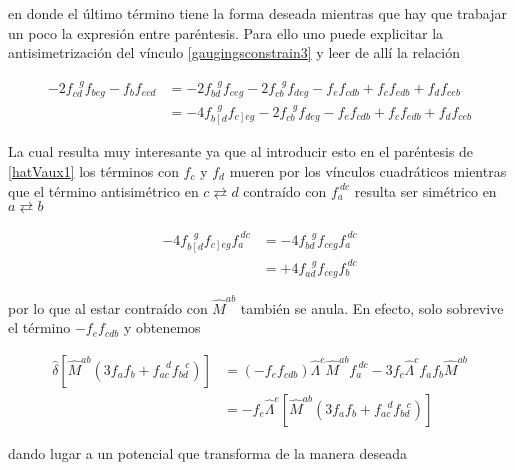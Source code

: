 \documentclass{article}
\numberwithin{equation}{section}
\begin{document}
en donde el último término tiene la forma deseada mientras que hay que trabajar un poco la expresión entre paréntesis. Para ello uno puede explicitar la antisimetrización del vínculo \ref{gaugingsconstrain3} y leer de allí la relación

\begin{equation}
\begin{aligned}
-2 f_{c d}^{\ \ \ g} f_{b e g} - f_b f_{e c d} &= -2 f_{b d}^{\ \ \ g} f_{c e g} - 2f_{c b}^{\ \ \ g} f_{d e g}  - f_e f_{c d b} +  f_c f_{e d b} +  f_d f_{c e b}\\
&=-4 f_{b \left[d\right.}^{\ \ \ g} f_{\left.c\right] e g} - 2f_{c b}^{\ \ \ g} f_{d e g}  - f_e f_{c d b} +  f_c f_{e d b} +  f_d f_{c e b}
\end{aligned}
\end{equation}

La cual resulta muy interesante ya que al introducir esto en el paréntesis de \ref{hatVaux1} los términos con $ f_c $ y $ f_d $ mueren por los vínculos cuadráticos mientras que el término antisimétrico en $ c \rightleftarrows d $ contraído con $ f_{a}^{\ d c} $ resulta ser simétrico en $ a \rightleftarrows b $

\begin{equation}
\begin{aligned}
-4 f_{b \left[d\right.}^{\ \ \ g} f_{\left.c\right] e g} f_{a}^{\ d c} &= -4 f_{b d}^{\ \ \ g} f_{c e g} f_{a}^{\ d c}\\
&= +4 f_{a d}^{\ \ \ g} f_{c e g} f_{b}^{\ d c}
\end{aligned}
\end{equation}

por lo que al estar contraído con $ \hat{M}^{a b} $ también se anula. En efecto, solo sobrevive el término $ - f_e f_{c d b} $ y obtenemos 

\begin{equation}
\begin{aligned}
\hat{\delta}\left[\hat{M}^{a b} \left( 3 f_a f_b + f_{a c}^{\ \ \ d} f_{b d}^{\ \ \ c} \right)\right]
&= \left( -f_e f_{c d b} \right) \hat{\Lambda}^e \hat{M}^{a b} f_{a}^{\ d c} - 3 f_c \hat{\Lambda}^c f_a f_b \hat{M}^{a b}\\
&= -f_e \hat{\Lambda}^e \left[ \hat{M}^{a b} \left( 3 f_a f_b + f_{a c}^{\ \ \ d} f_{b d}^{\ \ \ c} \right) \right]
\end{aligned}
\end{equation}

dando lugar a un potencial que transforma de la manera deseada
\end{document}
